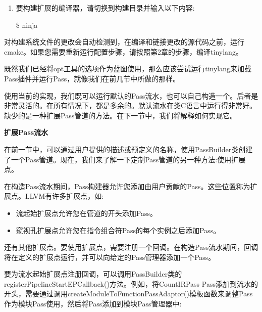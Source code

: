\begin{enumerate}
\item 要构建扩展的编译器，请切换到构建目录并输入以下内容:
\begin{tcolorbox}[colback=white,colframe=black]
\$ ninja
\end{tcolorbox}
\end{enumerate}

对构建系统文件的更改会自动检测到，在编译和链接更改的源代码之前，运行cmake。如果您需要重新运行配置步骤，请按照第2章的步骤，编译tinylang。\par

既然我们已经将opt工具的选项作为蓝图使用，那么应该尝试运行tinylang来加载Pass插件并运行Pass，就像我们在前几节中所做的那样。\par

使用当前的实现，我们既可以运行默认的Pass流水，也可以自己构造一个。后者是非常灵活的。在所有情况下，都是多余的。默认流水在类C语言中运行得非常好。缺少的是一种扩展Pass管道的方法。在下一节中，我们将解释如何实现它。\par



\hspace*{\fill} \par %
\textbf{扩展Pass流水}


在前一节中，可以通过用户提供的描述或预定义的名称，使用PassBuilder类创建了一个Pass管道。现在，我们来了解一下定制Pass管道的另一种方法:使用扩展点。\par

在构造Pass流水期间，Pass构建器允许您添加由用户贡献的Pass。这些位置称为扩展点。LLVM有许多扩展点，如:\par

\begin{itemize}
	\item 流起始扩展点允许您在管道的开头添加Pass。
	\item 窥视孔扩展点允许您在指令组合符Pass的每个实例之后添加Pass。
\end{itemize}

还有其他扩展点。要使用扩展点，需要注册一个回调。在构造Pass流水期间，回调将在定义的扩展点运行，并可以向给定的Pass管理器添加一个Pass。\par

要为流水起始扩展点注册回调，可以调用PassBuilder类的registerPipelineStartEPCallback()方法。例如，将CountIRPass Pass添加到流水的开头，需要通过调用createModuleToFunctionPassAdaptor()模板函数来调整Pass作为模块Pass使用，然后将Pass添加到模块Pass管理器中:\par


